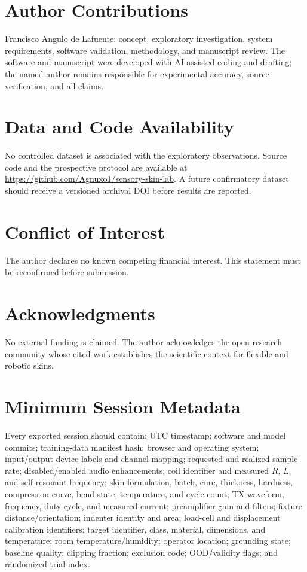 \documentclass[10pt]{article}
\begin{document}
\section*{Author Contributions}
Francisco Angulo de Lafuente: concept, exploratory investigation, system requirements, software validation, methodology, and manuscript review. The software and manuscript were developed with AI-assisted coding and drafting; the named author remains responsible for experimental accuracy, source verification, and all claims.

\section*{Data and Code Availability}
No controlled dataset is associated with the exploratory observations. Source code and the prospective protocol are available at \url{https://github.com/Agnuxo1/sensory-skin-lab}. A future confirmatory dataset should receive a versioned archival DOI before results are reported.

\section*{Conflict of Interest}
The author declares no known competing financial interest. This statement must be reconfirmed before submission.

\section*{Acknowledgments}
No external funding is claimed. The author acknowledges the open research community whose cited work establishes the scientific context for flexible and robotic skins.




\appendix
\section{Minimum Session Metadata}
Every exported session should contain: UTC timestamp; software and model commits; training-data manifest hash; browser and operating system; input/output device labels and channel mapping; requested and realized sample rate; disabled/enabled audio enhancements; coil identifier and measured $R$, $L$, and self-resonant frequency; skin formulation, batch, cure, thickness, hardness, compression curve, bend state, temperature, and cycle count; TX waveform, frequency, duty cycle, and measured current; preamplifier gain and filters; fixture distance/orientation; indenter identity and area; load-cell and displacement calibration identifiers; target identifier, class, material, dimensions, and temperature; room temperature/humidity; operator location; grounding state; baseline quality; clipping fraction; exclusion code; OOD/validity flags; and randomized trial index.
\end{document}
